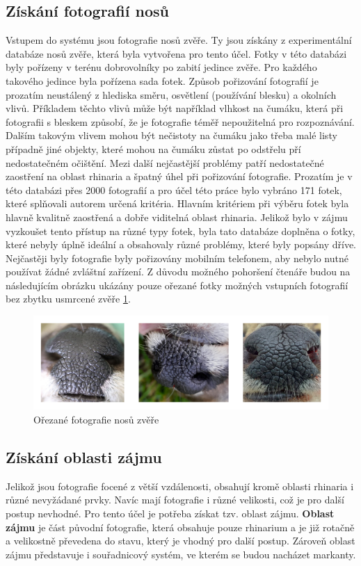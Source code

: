 \subsection{Získání fotografií nosů}
Vstupem do systému jsou fotografie nosů zvěře. Ty jsou získány z experimentální databáze nosů zvěře, která byla vytvořena pro tento účel. Fotky v této databázi byly pořízeny v terénu dobrovolníky po zabití jedince zvěře. Pro každého takového jedince byla pořízena sada fotek. Způsob pořizování fotografií je prozatím neustálený z hlediska směru, osvětlení (používání blesku) a okolních vlivů. Příkladem těchto vlivů může být například vlhkost na čumáku, která při fotografii s bleskem způsobí, že je fotografie téměř nepoužitelná pro rozpoznávání. Dalším takovým vlivem mohou být nečistoty na čumáku jako třeba malé listy případně jiné objekty, které mohou na čumáku zůstat po odstřelu pří nedostatečném očištění. Mezi další nejčastější problémy patří nedostatečné zaostření na oblast rhinaria a špatný úhel při pořizování fotografie. Prozatím je v této databázi přes 2000 fotografií a pro účel této práce bylo vybráno 171 fotek, které splňovali autorem určená kritéria. Hlavním kritériem při výběru fotek byla hlavně kvalitně zaostřená a dobře viditelná oblast rhinaria. Jelikož bylo v zájmu vyzkoušet tento přístup na různé typy fotek, byla tato databáze doplněna o fotky, které nebyly úplně ideální a obsahovaly různé problémy, které byly popsány dříve. Nejčastěji byly fotografie byly pořizovány mobilním telefonem, aby nebylo nutné používat žádné zvláštní zařízení. Z důvodu možného pohoršení čtenáře budou na následujícím obrázku ukázány pouze ořezané fotky možných vstupních fotografií bez zbytku usmrcené zvěře \ref{ukazka_fotek}.

\begin{figure}[h]
	\centering
	\includegraphics[width=1\textwidth]{obrazky/fotky_ukazka.png}
	\caption{Ořezané fotografie nosů zvěře}
	\label{ukazka_fotek}
\end{figure}

\subsection{Získání oblasti zájmu}
Jelikož jsou fotografie focené z větší vzdálenosti, obsahují kromě oblasti rhinaria i různé nevyžádané prvky. Navíc mají fotografie i různé velikosti, což je pro další postup nevhodné. Pro tento účel je potřeba získat tzv. oblast zájmu. \textbf{Oblast zájmu} je část původní fotografie, která obsahuje pouze rhinarium a je již rotačně a velikostně převedena do stavu, který je vhodný pro další postup. Zároveň oblast zájmu představuje i souřadnicový systém, ve kterém se budou nacházet markanty.

